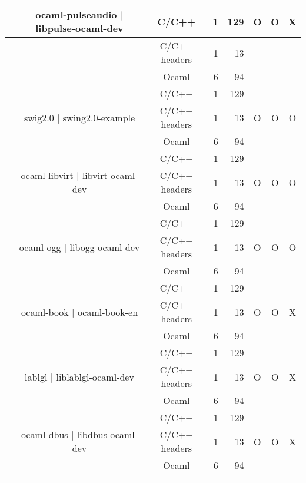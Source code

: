\documentclass[11pt,a4paper]{article}
\begin{document}
\begin{table}[h,t]
\begin{tabular}{|>{\centering}m{3cm}| c|c|r|r| c| c|c|}
 &\multirow{3}{3cm}{ocaml-pulseaudio | libpulse-ocaml-dev} & C/C++ & 1 & 129 & \multirow{3}{*}{O} & \multirow{3}{*}{O} & \multirow{3}{*}{X}\\
\cline{3-5}
& &                           C/C++ headers & 1 & 13 & & & \\
\cline{3-5}
& &                          Ocaml & 6 & 94 & & & \\
\cline{2-8}



 &\multirow{3}{3cm}{swig2.0 | swing2.0-example} & C/C++ & 1 & 129 & \multirow{3}{*}{O} & \multirow{3}{*}{O} & \multirow{3}{*}{O}\\
\cline{3-5}
& &                           C/C++ headers & 1 & 13 & & & \\
\cline{3-5}
& &                          Ocaml & 6 & 94 & & & \\
\cline{2-8}


 &\multirow{3}{3cm}{ocaml-libvirt | libvirt-ocaml-dev} & C/C++ & 1 & 129 & \multirow{3}{*}{O} & \multirow{3}{*}{O} & \multirow{3}{*}{O}\\
\cline{3-5}
& &                           C/C++ headers & 1 & 13 & & & \\
\cline{3-5}
& &                          Ocaml & 6 & 94 & & & \\
\cline{2-8}


 &\multirow{3}{3cm}{ocaml-ogg | libogg-ocaml-dev} & C/C++ & 1 & 129 & \multirow{3}{*}{O} & \multirow{3}{*}{O} & \multirow{3}{*}{O}\\
\cline{3-5}
& &                           C/C++ headers & 1 & 13 & & & \\
\cline{3-5}
& &                          Ocaml & 6 & 94 & & & \\
\cline{2-8}

 &\multirow{3}{3cm}{ocaml-book | ocaml-book-en} & C/C++ & 1 & 129 & \multirow{3}{*}{O} & \multirow{3}{*}{O} & \multirow{3}{*}{X}\\
\cline{3-5}
& &                           C/C++ headers & 1 & 13 & & & \\
\cline{3-5}
& &                          Ocaml & 6 & 94 & & & \\
\cline{2-8}


 &\multirow{3}{3cm}{lablgl | liblablgl-ocaml-dev} & C/C++ & 1 & 129 & \multirow{3}{*}{O} & \multirow{3}{*}{O} & \multirow{3}{*}{X}\\
\cline{3-5}
& &                           C/C++ headers & 1 & 13 & & & \\
\cline{3-5}
& &                          Ocaml & 6 & 94 & & & \\
\cline{2-8}
 &\multirow{3}{3cm}{ocaml-dbus | libdbus-ocaml-dev} & C/C++ & 1 & 129 & \multirow{3}{*}{O} & \multirow{3}{*}{O} & \multirow{3}{*}{X}\\
\cline{3-5}
& &                           C/C++ headers & 1 & 13 & & & \\
\cline{3-5}
& &                          Ocaml & 6 & 94 & & & \\
\cline{2-8}




\end{tabular}
\end{table}
\end{document}
